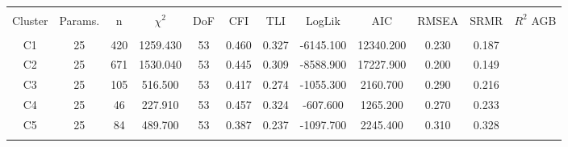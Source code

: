 
\begin{table}[!htbp] \centering 
  \caption{} 
  \label{full_model_fit_clust_stats} 
\begin{tabular}{@{\extracolsep{0pt}} ccccccccccc} 
\\[-1.8ex]\hline 
\hline \\[-1.8ex] 
{Cluster} & {Params.} & {n} & {$\chi^{2}$} & {DoF} & {CFI} & {TLI} & {LogLik} & {AIC} & {RMSEA} & {SRMR} & {$R^{2}$ AGB} \\
\hline \\[-1.8ex] 
C1 & 25 & 420 & 1259.430 & 53 & 0.460 & 0.327 & -6145.100 & 12340.200 & 0.230 & 0.187 \\ 
C2 & 25 & 671 & 1530.040 & 53 & 0.445 & 0.309 & -8588.900 & 17227.900 & 0.200 & 0.149 \\ 
C3 & 25 & 105 & 516.500 & 53 & 0.417 & 0.274 & -1055.300 & 2160.700 & 0.290 & 0.216 \\ 
C4 & 25 & 46 & 227.910 & 53 & 0.457 & 0.324 & -607.600 & 1265.200 & 0.270 & 0.233 \\ 
C5 & 25 & 84 & 489.700 & 53 & 0.387 & 0.237 & -1097.700 & 2245.400 & 0.310 & 0.328 \\ 
\hline \\[-1.8ex] 
\end{tabular} 
\end{table} 
